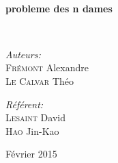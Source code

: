 \begin{titlepage}
\begin{center}





\HRule \\[0.4cm]
{ \huge \bfseries probleme des n dames \\[0.4cm] }

\HRule \\[1.5cm]

\begin{minipage}{0.4\textwidth}
\begin{flushleft} \large
\emph{Auteurs:}\\
\textsc{Frémont} Alexandre\\
\textsc{Le Calvar} Théo\\

\end{flushleft}
\end{minipage}
\begin{minipage}{0.4\textwidth}
\begin{flushright} \large
\emph{Référent:} \\
\textsc{Lesaint} David \\
\textsc{Hao} Jin-Kao 
\end{flushright}
\end{minipage}

\vfill

{\large Février 2015}

\end{center}
\end{titlepage}